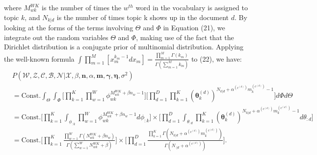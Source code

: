 \documentclass[a4paper]{article}
\begin{document}
  where $M^{WK}_{wk}$ is the number of times the $w^{th}$ word in the vocabulary is assigned to topic $k$, and $N_{k|d}$ is the number of times topic k shows up in the document $d$. By looking at the forms of the terms involving  $\Theta$ and $\Phi$ in Equation (21), we integrate out the random variables $\Theta$ and $\Phi$, making use of the fact that the Dirichlet distribution is a conjugate prior of multinomial distribution. Applying the well-known formula $\int\prod_{m=1}^{M}[x_m^{k_m-1}dx_m]=\frac{\prod_{m=1}^M\Gamma(k_m)}{\Gamma(\sum_{m=1}^Mk_m)}$ to (22), we have:
  \begin{equation}
  \begin{aligned}
  &P(\mathcal{W}, \mathcal{Z}, \mathcal{C}, \mathcal{B}, \mathcal{N}| \mathcal{X}, \beta, \boldsymbol{n}, \alpha, \boldsymbol{m}, \boldsymbol{\gamma}, \boldsymbol{\eta}, \sigma^2)\\&=\mbox{Const.}\int_{\Theta}\int_{\Phi}\Big[\prod_{k=1}^{K}\prod_{w=1}^{W}\phi_{wk}^{M^{WK}_{wk}+\beta n_w-1}\Big]\Big[\prod_{d=1}^{D}\prod_{k=1}^{K}(\boldsymbol{\theta}^{(d)}_{k})^{N_{k|d}+\alpha^{(c^{(d)})} m^{(c^{(d)})} _k-1}\Big]d\Phi d\Theta
  \\&=\mbox{Const.}\Big[\prod_{k=1}^{K}\int_{\phi_{:k}}\prod_{w=1}^{W}\phi_{wk}^{M^{WK}_{wk}+\beta n_w-1  }d\phi_{:k}\Big]\times\Big[\prod_{d=1}^{D}\int_{\theta_{:d}}\prod_{k=1}^{K}(\boldsymbol{\theta}^{(d)}_{k})^{N_{k|d}+\alpha^{(c^{(d)})} m^{(c^{(d)})}_k-1}d\theta_{:d}\Big]
  \\&=\mbox{Const.}\Big[\prod_{k=1}^{K}\frac{\prod_{w=1}^W\Gamma(N_{wk}^{WK}+\beta n_w)}{\Gamma(\sum_{w=1}^WN_{wk}^{WK}+\beta )}\Big]\times\Big[\prod_{d=1}^{D}\frac{\prod_{k=1}^K\Gamma(N_{k|d}+\alpha^{(c^{(d)})} m^{(c^{(d)})}_k)}{\Gamma(N_{\cdot|d}+\alpha^{(c^{(d)})})}\Big].
  \end{aligned}
  \end{equation}
\end{document}
